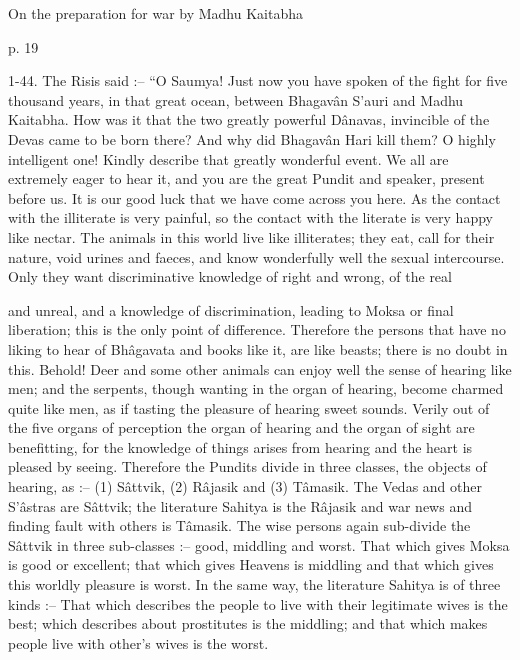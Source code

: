 On the preparation for war by Madhu Kaitabha

p. 19

 

1-44. The Risis said :-- “O Saumya! Just now you have spoken of the fight for five thousand years, in that great ocean, between Bhagavân S’auri and Madhu Kaitabha. How was it that the two greatly powerful Dânavas, invincible of the Devas came to be born there? And why did Bhagavân Hari kill them? O highly intelligent one! Kindly describe that greatly wonderful event. We all are extremely eager to hear it, and you are the great Pundit and speaker, present before us. It is our good luck that we have come across you here. As the contact with the illiterate is very painful, so the contact with the literate is very happy like nectar. The animals in this world live like illiterates; they eat, call for their nature, void urines and faeces, and know wonderfully well the sexual intercourse. Only they want discriminative knowledge of right and wrong, of the real

 

 

and unreal, and a knowledge of discrimination, leading to Moksa or final liberation; this is the only point of difference. Therefore the persons that have no liking to hear of Bhâgavata and books like it, are like beasts; there is no doubt in this. Behold! Deer and some other animals can enjoy well the sense of hearing like men; and the serpents, though wanting in the organ of hearing, become charmed quite like men, as if tasting the pleasure of hearing sweet sounds. Verily out of the five organs of perception the organ of hearing and the organ of sight are benefitting, for the knowledge of things arises from hearing and the heart is pleased by seeing. Therefore the Pundits divide in three classes, the objects of hearing, as :-- (1) Sâttvik, (2) Râjasik and (3) Tâmasik. The Vedas and other S’âstras are Sâttvik; the literature Sahitya is the Râjasik and war news and finding fault with others is Tâmasik. The wise persons again sub-divide the Sâttvik in three sub-classes :-- good, middling and worst. That which gives Moksa is good or excellent; that which gives Heavens is middling and that which gives this worldly pleasure is worst. In the same way, the literature Sahitya is of three kinds :-- That which describes the people to live with their legitimate wives is the best; which describes about prostitutes is the middling; and that which makes people live with other's wives is the worst.

